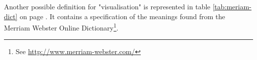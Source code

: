 Another possible definition for "visualisation" is represented in table \ref{tab:meriam-dict} on page \pageref{tab:meriam-dict}. It contains a specification of the meanings found from the Merriam Webster Online Dictionary\footnote{See \href{http://www.merriam-webster.com/}{http://www.merriam-webster.com/}}.










